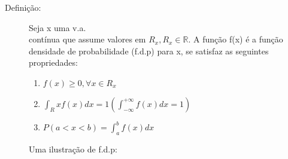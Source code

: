 \documentclass[11pt,a4paper]{book}
\begin{document}
   \begin{description}
     \item [Definição:] Seja x uma v.a.\\ contínua que assume valores em $R_{x},R_{x} \in \mathbb{R}$.
       A função f(x) é a função densidade de probabilidade (f.d.p) para x, se satisfaz as 
       seguintes propriedades: 
       \begin{enumerate} %
         \item $f(x)\geq 0, \forall x \in R_{x}$
         \item $\int_R{x} f(x) dx=1 (\int_{- \infty}^{+ \infty} f(x)dx=1)$
         \item $P(a<x<b)=\int^b_a f(x) dx $
       \end{enumerate}
       Uma ilustração de f.d.p: 
       \begin{figure}[htpb]
         \centering
         \caption{}
         \label{fig:25}


\end{figure}
\end{description}
\end{document}
